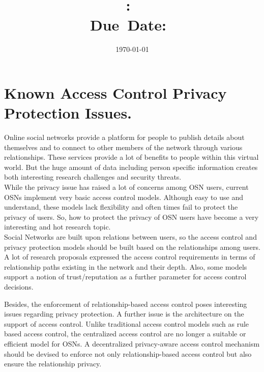 \documentclass[24pt]{article}
\title{\textmd{\textbf{\hmwkClass:\
      \hmwkTitle}}\\\normalsize\small{Due\ Date:\
    \hmwkDueDate}\\}
\date{\today}
\author{\textbf{\hmwkAuthorName}}
\begin{document}
\section*{Known Access Control Privacy Protection Issues.}
Online social networks provide a platform for people to publish
details about themselves and to connect to other members of the
network through various relationships. These services provide a lot
of benefits to people within this virtual world. But the
huge amount of data including person specific information creates both
interesting research challenges and security threats. \\
While the privacy issue has raised a lot of concerns among OSN users,
current OSNs implement very basic access control models. Although
easy to use and understand, these models lack flexibility and often
times fail to protect the privacy of users. So, how to protect the
privacy of OSN users have become a very interesting and hot research
topic. \\
Social Networks are built upon relations between users, so the access
control and privacy protection models should be built based on the
relationships among users. A lot of research proposals expressed the
access control requirements in terms of relationship paths existing in
the network and their depth. Also, some models support a notion of
trust/reputation as a further parameter for access control decisions.

Besides, the enforcement of relationship-based access control poses
interesting issues regarding privacy protection. A further issue is
the architecture on the support of access control. Unlike traditional
access control models such as rule based access control, the
centralized access control are no longer a suitable or efficient model
for OSNs. A decentralized privacy-aware access control mechanism
should be devised to enforce not only relationship-based access
control but also ensure the relationship privacy. 
\end{document}
